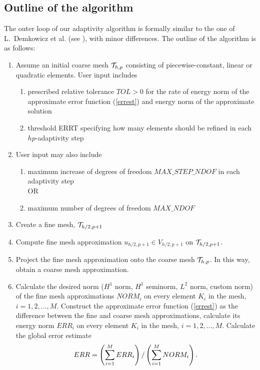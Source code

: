 \subsection{Outline of the algorithm}

The outer loop of our adaptivity algorithm is formally similar
to the one of L.~Demkowicz et al. (see \cite{derade}), with minor
differences. The outline of the algorithm is as follows:
\begin{enumerate}
\item Assume an initial coarse mesh ${\cal{T}}_{h,p}$ consisting of piecewise-constant, linear or
      quadratic elements. User input includes
      \begin{enumerate}
			\item prescribed relative tolerance $TOL > 0$ for the
			      rate of energy norm of the approximate error function (\ref{errest}) and energy norm of the approximate solution 
			\item threshold ERRT specifying how many elements should be refined in each $hp$-adaptivity step
		\end{enumerate}
\item User input may also include
		\begin{enumerate}
			\item maximum increase of degrees of freedom $MAX\_STEP\_NDOF$ in each adaptivity step\\OR\\
			\item maximum number of degrees of freedom $MAX\_NDOF$
      \end{enumerate}

\item Create a fine mesh, ${\cal{T}}_{h/2,p+1}$

\item Compute fine mesh approximation $u_{h/2,p+1} \in V_{h/2,p+1}$ on ${\cal{T}}_{h/2,p+1}$.

\item Project the fine mesh approximation onto the coarse mesh ${\cal{T}}_{h,p}$. In this way, obtain a coarse mesh approximation.

\item Calculate the desired norm ($H^1$ norm, $H^1$ seminorm, $L^2$ norm, custom norm) of the fine mesh approximations $NORM_i$ on every element $K_i$ in the mesh, $i = 1, 2, \ldots, M$. Construct the approximate error function (\ref{errest}) as the difference between the fine and coarse mesh approximations, calculate its energy norm $ERR_i$ on every element $K_i$ in the mesh, $i = 1, 2, \ldots, M$. Calculate the global error estimate $$ERR = \left(\sum_{i=1}^M ERR_i\right) / \left(\sum_{i=1}^M NORM_i\right).$$
      

\end{enumerate}
